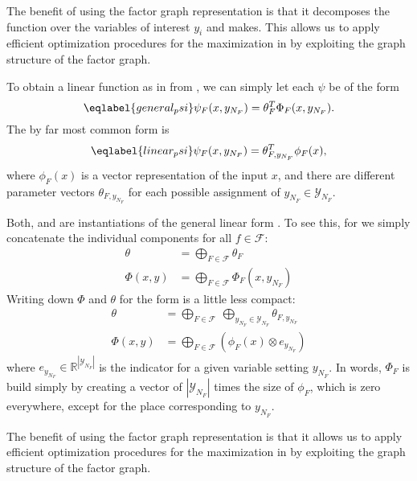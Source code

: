 The benefit of using the factor graph representation is that it decomposes the
function over the variables of interest $y_i$ and makes. This allows us to
apply efficient optimization procedures for the maximization in
 by exploiting the graph structure of the factor graph.

To obtain a linear function as in  from
, we can simply let each $\psi$ be of the form
\begin{equation}\eqlabel{general_psi}
    \psi_F(x, y_{N_F}) = \theta_F^T \Phi_F(x, y_{N_F}).
\end{equation}
The by far most common form is 
\begin{equation}\eqlabel{linear_psi}
    \psi_F(x, y_{N_F}) = \theta_{F, y_{N_F}}^T \phi_F(x),
\end{equation}
where $\phi_F(x)$ is a vector representation of the input $x$, and there are
different parameter vectors $\theta_{F, y_{N_F}}$ for each possible assignment
of $y_{N_F} \in \mathcal{Y}_{N_F}$.

Both,  and  are instantiations of the general
linear form . To see this, for  we simply
concatenate the individual components for all $f \in \mathcal{F}$:
\begin{align}
    \theta &= \bigoplus_{F \in \mathcal{F}} \theta_F\\
    \Phi(x, y) &= \bigoplus_{F \in \mathcal{F}} \Phi_F(x, y_{N_F})
\end{align}
Writing down $\Phi$ and $\theta$ for the form  is a little less compact:
\begin{align}
    \theta &= \bigoplus_{F \in \mathcal{F}}\ \bigoplus_{y_{N_F} \in \mathcal{Y}_{N_F}} \theta_{F, y_{N_F}}\\
    \Phi(x, y) &= \bigoplus_{F \in \mathcal{F}} \left (\phi_F(x) \otimes e_{y_{N_F}} \right )
\end{align}
where $e_{y_{N_F}} \in \mathbb{R}^{|\mathcal{Y}_{N_F}|}$ is the indicator for a
given variable setting $y_{N_F}$.
In words, $\Phi_F$ is build simply by creating a vector of
$|\mathcal{Y}_{N_F}|$ times the size of $\phi_F$, which is zero everywhere,
except for the place corresponding to $y_{N_F}$. %

The benefit of using the factor graph representation is that it allows us to
apply efficient optimization procedures for the maximization in
 by exploiting the graph structure of the factor graph.

